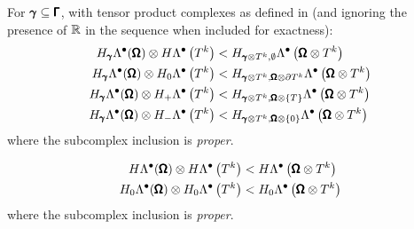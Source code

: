             \noindent\makebox[\linewidth]{\rule{\textwidth}{0.4pt}}
            \begin{lemma}
                For $\pmb{\mathsf{\gamma}}  \subseteq  \pmb{\mathsf{\Gamma}}$, with tensor product complexes as defined in \cite{ABB15} (and ignoring the presence of $\mathbb{R}$ in the sequence when included for exactness):
                \begin{align}
                    H_{\pmb{\mathsf{\gamma}}}\Lambda^{\bullet}(\pmb{\mathsf{\Omega}})\otimes H\Lambda^{\bullet}\left(T^{k}\right)  &<  H_{\pmb{\mathsf{\gamma}}\otimes T^{k}, \emptyset}\Lambda^{\bullet}\left(\pmb{\mathsf{\Omega}}\otimes T^{k}\right)  \\
                    H_{\pmb{\mathsf{\gamma}}}\Lambda^{\bullet}(\pmb{\mathsf{\Omega}})\otimes H_{0}\Lambda^{\bullet}\left(T^{k}\right)  &<  H_{\pmb{\mathsf{\gamma}}\otimes T^{k}, \pmb{\mathsf{\Omega}}\otimes\partial T^{k}}\Lambda^{\bullet}\left(\pmb{\mathsf{\Omega}}\otimes T^{k}\right)  \\
                    H_{\pmb{\mathsf{\gamma}}}\Lambda^{\bullet}(\pmb{\mathsf{\Omega}})\otimes H_{+}\Lambda^{\bullet}\left(T^{k}\right)  &<  H_{\pmb{\mathsf{\gamma}}\otimes T^{k}, \pmb{\mathsf{\Omega}}\otimes\{T\}}\Lambda^{\bullet}\left(\pmb{\mathsf{\Omega}}\otimes T^{k}\right)  \\
                    H_{\pmb{\mathsf{\gamma}}}\Lambda^{\bullet}(\pmb{\mathsf{\Omega}})\otimes H_{-}\Lambda^{\bullet}\left(T^{k}\right)  &<  H_{\pmb{\mathsf{\gamma}}\otimes T^{k}, \pmb{\mathsf{\Omega}}\otimes\{0\}}\Lambda^{\bullet}\left(\pmb{\mathsf{\Omega}}\otimes T^{k}\right)
                \end{align}
                where the subcomplex inclusion is \emph{proper}.
            \end{lemma}

            \begin{corollary}\label{cor:tensor product complex inclusion}
                \begin{align}
                    H\Lambda^{\bullet}(\pmb{\mathsf{\Omega}})\otimes H\Lambda^{\bullet}\left(T^{k}\right)  &<  H\Lambda^{\bullet}\left(\pmb{\mathsf{\Omega}}\otimes T^{k}\right)  \\
                    H_{0}\Lambda^{\bullet}(\pmb{\mathsf{\Omega}})\otimes H_{0}\Lambda^{\bullet}\left(T^{k}\right)  &<  H_{0}\Lambda^{\bullet}\left(\pmb{\mathsf{\Omega}}\otimes T^{k}\right)
                \end{align}
                where the subcomplex inclusion is \emph{proper}.
            \end{corollary}
            \noindent\makebox[\linewidth]{\rule{\textwidth}{0.4pt}}
    